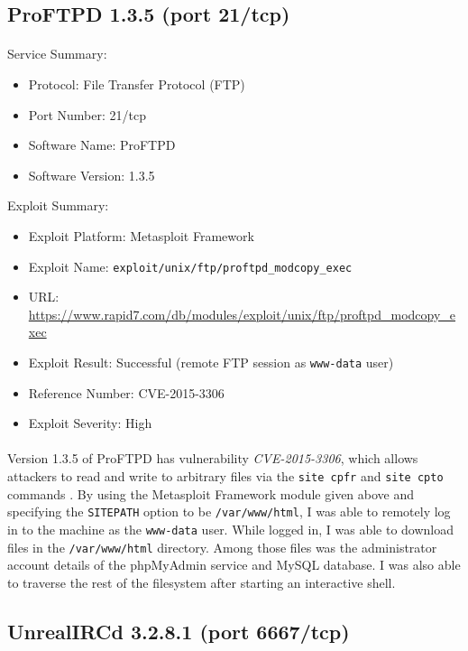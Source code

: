 \documentclass{article}
\begin{document}
\subsection{ProFTPD 1.3.5 (port 21/tcp)}
\label{subsec:pro_ftpd}
\paragraph{}
Service Summary:
\begin{itemize}
	\item Protocol: File Transfer Protocol (FTP)
	\item Port Number: 21/tcp
	\item Software Name: ProFTPD
	\item Software Version: 1.3.5
\end{itemize}
Exploit Summary:
\begin{itemize}
	\item Exploit Platform: Metasploit Framework
	\item Exploit Name: \texttt{exploit/unix/ftp/proftpd\_modcopy\_exec}
	\item URL: \url{https://www.rapid7.com/db/modules/exploit/unix/ftp/proftpd\_modcopy\_exec}
	\item Exploit Result: Successful (remote FTP session as \texttt{www-data} user)
	\item Reference Number: CVE-2015-3306
	\item Exploit Severity: High
\end{itemize}

\paragraph{}
Version 1.3.5 of ProFTPD has vulnerability \emph{CVE-2015-3306}, which allows attackers to read and write to arbitrary files via the \texttt{site cpfr} and \texttt{site cpto} commands \parencite{mitre20153306}.
By using the Metasploit Framework module given above and specifying the \texttt{SITEPATH} option to be \texttt{/var/www/html}, I was able to remotely log in to the machine as the \texttt{www-data} user.
While logged in, I was able to download files in the \texttt{/var/www/html} directory.
Among those files was the administrator account details of the phpMyAdmin service and MySQL database.
I was also able to traverse the rest of the filesystem after starting an interactive shell.

\subsection{UnrealIRCd 3.2.8.1 (port 6667/tcp)}
\label{subsec:unreal_ircd}
\end{document}
